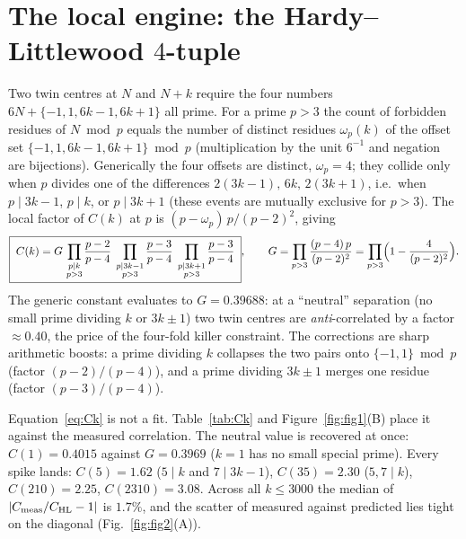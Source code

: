 \documentclass[11pt]{article}
\theoremstyle{definition}
\begin{document}
\section{The local engine: the Hardy--Littlewood $4$-tuple}
Two twin centres at $N$ and $N+k$ require the four numbers $6N+\{-1,1,6k-1,6k+1\}$ all prime. For a
prime $p>3$ the count of forbidden residues of $N\bmod p$ equals the number of distinct residues
$\omega_{p}(k)$ of the offset set $\{-1,1,6k-1,6k+1\}\bmod p$ (multiplication by the unit
$6^{-1}$ and negation are bijections). Generically the four offsets are distinct, $\omega_{p}=4$; they
collide only when $p$ divides one of the differences $2(3k-1),\,6k,\,2(3k+1)$, i.e.\ when
$p\mid 3k-1$, $p\mid k$, or $p\mid 3k+1$ (these events are mutually exclusive for $p>3$). The local
factor of $C(k)$ at $p$ is $(p-\omega_{p})\,p/(p-2)^{2}$, giving
\begin{equation}
\boxed{\;C(k)=G\,\prod_{\substack{p\mid k\\p>3}}\frac{p-2}{p-4}\;
\prod_{\substack{p\mid 3k-1\\p>3}}\frac{p-3}{p-4}\;
\prod_{\substack{p\mid 3k+1\\p>3}}\frac{p-3}{p-4}\;},\qquad
G=\prod_{p>3}\frac{(p-4)\,p}{(p-2)^{2}}=\prod_{p>3}\Bigl(1-\frac{4}{(p-2)^{2}}\Bigr).
\label{eq:Ck}
\end{equation}
The generic constant evaluates to $G=0.39688$: at a ``neutral'' separation (no small prime dividing
$k$ or $3k\pm1$) two twin centres are \emph{anti}-correlated by a factor $\approx0.40$, the price of
the four-fold killer constraint. The corrections are sharp arithmetic boosts: a prime dividing $k$
collapses the two pairs onto $\{-1,1\}\bmod p$ (factor $(p-2)/(p-4)$), and a prime dividing
$3k\pm1$ merges one residue (factor $(p-3)/(p-4)$).

Equation~\eqref{eq:Ck} is not a fit. Table~\ref{tab:Ck} and Figure~\ref{fig:fig1}(B) place it against
the measured correlation. The neutral value is recovered at once: $C(1)=0.4015$ against $G=0.3969$
($k=1$ has no small special prime). Every spike lands: $C(5)=1.62$ ($5\mid k$ and $7\mid 3k\!-\!1$),
$C(35)=2.30$ ($5,7\mid k$), $C(210)=2.25$, $C(2310)=3.08$. Across all $k\le3000$ the median of
$|C_{\rm meas}/C_{\rm HL}-1|$ is $1.7\%$, and the scatter of measured against predicted lies tight on
the diagonal (Fig.~\ref{fig:fig2}(A)).
\end{document}
